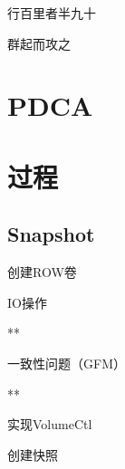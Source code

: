 行百里者半九十

群起而攻之

\section{PDCA}


\section{过程}

\subsection{Snapshot}

\begin{enumbox}
\item 创建ROW卷
\item IO操作
\item ***
\item 一致性问题（GFM）
\item ***
\item 实现VolumeCtl
\item 创建快照
\end{enumbox}
